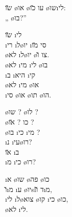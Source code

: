 \u{שו} \o{או} \o{עו} \u{כו} \o{שו}\i{לי}:\\
„   \o{בו}?”

\u{שו} \i{לי} \\
\i{רי} \i{ל}\o{יו}  \i{סי} \u{מו}\\
 \o{לא} \i{ל}\o{יו}  \o{צו} \u{ו}.\\
 \o{לא} \i{מי} \i{לי} \o{בו}\\
 \i{ב} \i{היא} \i{קי} \\
\o{לא} \i{מי}  \o{או}\\
\i{סי} \o{או}  \o{תו} \o{הו}.

\o{שו}  ? \o{לו}  ?\\
\o{כו}  ? \u{או}   ?\\
 \o{בו} \i{כי} \i{מי} ?\\
\i{נ}  \i{עי}\o{רו}?\\
\u{או} \i{ב} \\
\i{מ} \i{כי} \o{רו}?

\i{א} \o{שו} \o{פה} \o{כו}\\
\u{ו}\i{מ} \i{ע} \o{יו}slד \u{ו}\i{מ},\\
\i{לי}  \i{ל}\o{צוא}  \o{קו} \i{כי} \o{כו},\\
\o{לא} \i{לי}.
